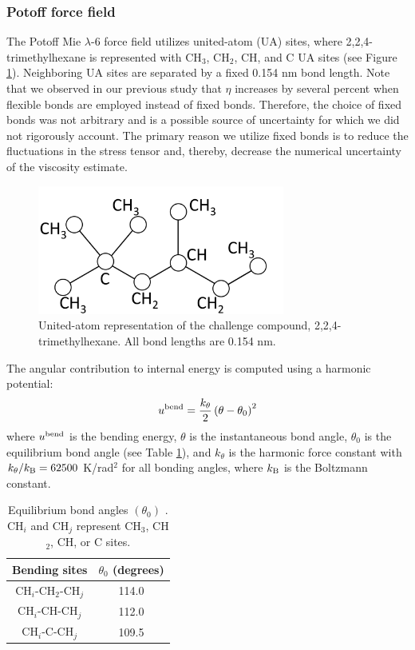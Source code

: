 \documentclass[preprint,review,12pt]{elsarticle}
\begin{document}
    \subsubsection{Potoff force field}
	
	The Potoff Mie $\lambda$-6 force field utilizes united-atom (UA) sites, where 2,2,4-trimethylhexane is represented with CH$_3$, CH$_2$, CH, and C UA sites (see Figure \ref{fig:224TMH}). Neighboring UA sites are separated by a fixed 0.154 nm bond length. Note that we observed in our previous study that $\eta$ increases by several percent when flexible bonds are employed instead of fixed bonds. Therefore, the choice of fixed bonds was not arbitrary and is a possible source of uncertainty for which we did not rigorously account. The primary reason we utilize fixed bonds is to reduce the fluctuations in the stress tensor and, thereby, decrease the numerical uncertainty of the viscosity estimate.
	
	\begin{figure}[htb!]
		\centering
		\includegraphics[width=3.2in]{UA_IFPSC10}
		\caption{United-atom representation of the challenge compound, 2,2,4-trimethylhexane. All bond lengths are 0.154 nm.} 
		\label{fig:224TMH}
	\end{figure}
	
	The angular contribution to internal energy is computed using a harmonic potential:
	\begin{equation}
	u^{\rm bend} = \frac{k_\theta}{2} \left(\theta-\theta_0\right)^2
	\end{equation}
	where $u^{\rm bend}$ is the bending energy, $\theta$ is the instantaneous bond angle, $\theta_0$ is the equilibrium bond angle (see Table \ref{tab:angles}), and $k_\theta$ is the harmonic force constant with $k_\theta/k_{\rm B} = 62500$ K/rad$^2$ for all bonding angles, where $k_{\rm B}$ is the Boltzmann constant. 
	
	\begin{table}[h!]
		\caption{Equilibrium bond angles $(\theta_0)$ \cite{Martin1999,Potoff_branched}. CH$_i$ and CH$_j$ represent CH$_3$, CH$_2$, CH, or C sites.} \label{tab:angles}
		\begin{center}
			\begin{tabular}{|c|c|}
				\hline
				Bending sites & $\theta_0$ (degrees) \\ \hline
				CH$_i$-CH$_2$-CH$_j$ & 114.0 \\ 
				CH$_i$-CH-CH$_j$ & 112.0 \\ 
				CH$_i$-C-CH$_j$ & 109.5 \\  
				\hline
			\end{tabular}
		\end{center} 
	\end{table}
	
\end{document}
